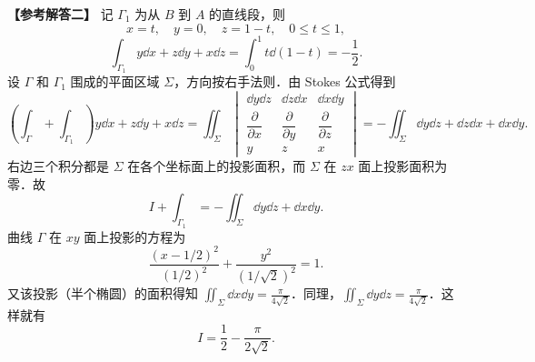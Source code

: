 \begin{solution}
  \textbf{【参考解答二】} 记 $\Gamma_1$ 为从 $B$ 到 $A$ 的直线段，则
  \[
    x=t,\quad y=0,\quad z=1-t,\quad 0\le t\le 1,
  \]
  \[
    \int_{\Gamma_1}y\dd x+z\dd y+x\dd z=\int_0^1 t\dd(1-t)=-\frac{1}{2}.
  \]
  设 $\Gamma$ 和 $\Gamma_1$ 围成的平面区域 $\Sigma$，方向按右手法则．由 Stokes 公式得到
  \[
    \left(\int_\Gamma+\int_{\Gamma_1}\right)y\dd x+z\dd y+x\dd z
    =\iint_\Sigma\begin{vmatrix}
      \dd y\dd z&\dd z\dd x&\dd x\dd y\\[2pt]
      \dfrac{\partial}{\partial x}&\dfrac{\partial}{\partial y}&\dfrac{\partial}{\partial z}\\[2pt]
      y&z&x
    \end{vmatrix}
    =-\iint_\Sigma \dd y\dd z+\dd z\dd x+\dd x\dd y.
  \]
  右边三个积分都是 $\Sigma$ 在各个坐标面上的投影面积，而 $\Sigma$ 在 $zx$ 面上投影面积为零．故
  \[
    I+\int_{\Gamma_1}=-\iint_\Sigma \dd y\dd z+\dd x\dd y.
  \]
  曲线 $\Gamma$ 在 $xy$ 面上投影的方程为
  \[
    \frac{(x-1/2)^2}{(1/2)^2}+\frac{y^2}{(1/\sqrt{2})^2}=1.
  \]
  又该投影（半个椭圆）的面积得知 $\displaystyle \iint_\Sigma \dd x\dd y=\frac{\pi}{4\sqrt{2}}$．同理，$\displaystyle \iint_\Sigma \dd y\dd z=\frac{\pi}{4\sqrt{2}}$．这样就有
  \[
    I=\frac{1}{2}-\frac{\pi}{2\sqrt{2}}.
  \]
\end{solution}


